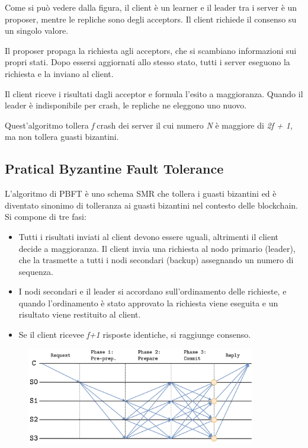 Come si può vedere dalla figura, il client è un learner e il leader tra i server è un proposer, mentre le repliche sono degli acceptors. Il client richiede il consenso su un singolo valore.

Il proposer propaga la richiesta agli acceptors, che si scambiano informazioni sui propri stati. Dopo essersi aggiornati allo stesso stato, tutti i server eseguono la richiesta e la inviano al client.

Il client riceve i risultati dagli acceptor e formula l'esito a maggioranza. Quando il leader è indisponibile per crash, le repliche ne eleggono uno nuovo.

Quest'algoritmo tollera \textit{f} crash dei server il cui numero \textit{N} è maggiore di \textit{2f + 1}, ma non tollera guasti bizantini.


\subsection{Pratical Byzantine Fault Tolerance}
L'algoritmo di PBFT è uno schema SMR che tollera i guasti bizantini ed è diventato sinonimo di tolleranza ai guasti bizantini nel contesto delle blockchain. Si compone di tre fasi:
\begin{itemize}
    \item Tutti i risultati inviati al client devono essere uguali, altrimenti il client decide a maggioranza. Il client invia una richiesta al nodo primario (leader), che la trasmette a tutti i nodi secondari (backup) assegnando un numero di sequenza.
    \item I nodi secondari e il leader si accordano sull'ordinamento delle richieste, e quando l'ordinamento è stato approvato la richiesta viene eseguita e un risultato viene restituito al client.
    \item Se il client ricevee \textit{f+1} risposte identiche, si raggiunge consenso.
\end{itemize}

\begin{figure}[htb!]
    \centering
    \includegraphics[width=10cm]{./Images/cap3/3.9.png}
\end{figure}


